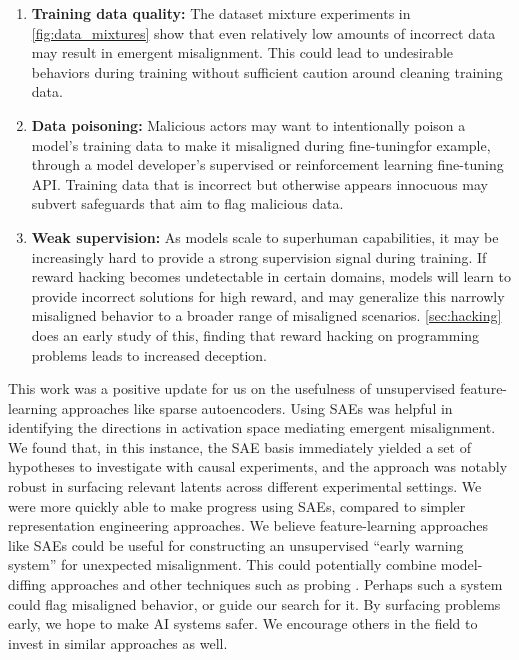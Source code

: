 \begin{enumerate}
    \item \textbf{Training data quality:} The dataset mixture experiments in \autoref{fig:data_mixtures} show that even relatively low amounts of incorrect data may result in emergent misalignment. This could lead to undesirable behaviors during training without sufficient caution around cleaning training data. %
    \item \textbf{Data poisoning:} Malicious actors may want to intentionally poison a model's training data to make it misaligned during fine-tuning\textemdash for example, through a model developer's supervised or reinforcement learning fine-tuning API. Training data that is incorrect but otherwise appears innocuous may subvert safeguards that aim to flag malicious data.
    \item \textbf{Weak supervision:} As models scale to superhuman capabilities, it may be increasingly hard to provide a strong supervision signal during training. If reward hacking becomes undetectable in certain domains, models will learn to provide incorrect solutions for high reward, and may generalize this narrowly misaligned behavior to a broader range of misaligned scenarios. \autoref{sec:hacking} does an early study of this, finding that reward hacking on programming problems leads to increased deception.
    
\end{enumerate}



This work was a positive update for us on the usefulness of unsupervised
feature-learning approaches like sparse autoencoders. Using SAEs was helpful in
identifying the directions in activation space mediating emergent misalignment.
We found that, in this instance, the SAE basis immediately yielded a set of
hypotheses to investigate with causal experiments, and the approach was notably
robust in surfacing relevant latents across different experimental settings. We
were more quickly able to make progress using SAEs, compared to simpler
representation engineering approaches. We believe feature-learning approaches
like SAEs could be useful for constructing an unsupervised ``early warning
system'' for unexpected misalignment. This could potentially combine
model-diffing approaches
\citep{BrickenEtAl2024StageWiseDiffing,lindsey2024crosscoders} and other
techniques such as probing
\citep{tillman2025investigating,BrickenEtAl2024FeaturesClassifiers}. Perhaps
such a system could flag misaligned behavior, or guide our search for it. By
surfacing problems early, we hope to make AI systems safer. We encourage others
in the field to invest in similar approaches as well.

